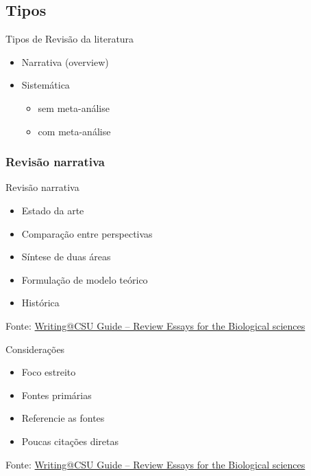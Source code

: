 \documentclass{beamer}
\begin{document}
\subsection{Tipos}

\begin{frame}{Tipos de Revisão da literatura}
  \begin{itemize}
    \footnotesize
  \item Narrativa (overview)
    \bigskip
  \item Sistemática
    \begin{itemize}
      \scriptsize
      \medskip
    \item sem meta-análise
      \smallskip
    \item com meta-análise
    \end{itemize}
  \end{itemize}
\end{frame}

\subsubsection[Narrativa]{Revisão narrativa}

\begin{frame}{Revisão narrativa}
  \begin{itemize}
    \scriptsize
  \item Estado da arte
    \bigskip
  \item Comparação entre perspectivas
    \bigskip
  \item Síntese de duas áreas
    \bigskip
  \item Formulação de modelo teórico
    \bigskip
  \item Histórica
  \end{itemize}

  \vfill
  \scriptsize
  \hfill Fonte: \href{https://writing.colostate.edu/guides/guide.cfm?guideid=79}
  {\tiny Writing@CSU Guide -- Review Essays for the Biological sciences}
\end{frame}

\begin{frame}{Considerações}
  \begin{itemize}
    \footnotesize
  \item Foco estreito
    \bigskip
  \item Fontes primárias
    \bigskip
  \item Referencie as fontes
    \bigskip
  \item Poucas citações diretas
  \end{itemize}

  \vfill
  \scriptsize
  \hfill Fonte: \href{https://writing.colostate.edu/guides/guide.cfm?guideid=79}
  {\tiny Writing@CSU Guide -- Review Essays for the Biological sciences}
\end{frame}
\end{document}
